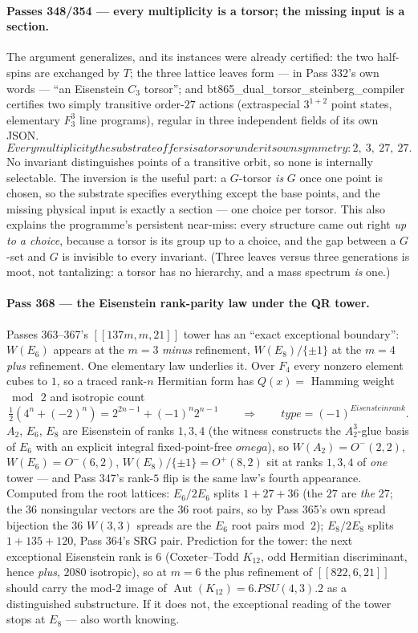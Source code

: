 \documentclass[12pt,a4paper]{article}
\def\mathbb#1{#1}%
\def\mathrm#1{#1}%
\def\textbf#1{#1}%
\def\texttt#1{#1}%
\def\text#1{#1}%
\def\omega{omega}%
\theoremstyle{definition}
\newcommand{\FF}{\mathbb{F}}
\begin{document}
\paragraph{Passes 348/354 --- every multiplicity is a torsor; the missing input
is a section.}
The argument generalizes, and its instances were already certified: the two
half-spins are exchanged by $T$; the three lattice leaves form --- in Pass 332's
own words --- ``an Eisenstein $C_3$ torsor''; and
\texttt{bt865\_dual\_torsor\_steinberg\_compiler} certifies two simply
transitive order-$27$ actions (extraspecial $3^{1+2}$ point states, elementary
$\FF_3^3$ line programs), regular in three independent fields of its own JSON.
\[
\textbf{Every multiplicity the substrate offers is a torsor under its own
symmetry: } 2,\ 3,\ 27,\ 27.
\]
No invariant distinguishes points of a transitive orbit, so none is internally
selectable.  The inversion is the useful part: a $G$-torsor \emph{is} $G$ once
one point is chosen, so \textbf{the substrate specifies everything except the
base points, and the missing physical input is exactly a section} --- one
choice per torsor.  This also explains the programme's persistent near-miss:
every structure came out right \emph{up to a choice}, because a torsor is its
group up to a choice, and the gap between a $G$-set and $G$ is invisible to
every invariant.  (Three leaves versus three generations is moot, not
tantalizing: a torsor has no hierarchy, and a mass spectrum \emph{is} one.)

\paragraph{Pass 368 --- the Eisenstein rank-parity law under the QR tower.}
Passes 363--367's $[[137m,m,21]]$ tower has an ``exact exceptional boundary'':
$W(E_6)$ appears at the $m{=}3$ \emph{minus} refinement, $W(E_8)/\{\pm1\}$ at
the $m{=}4$ \emph{plus} refinement.  One elementary law underlies it.  Over
$\FF_4$ every nonzero element cubes to $1$, so a traced rank-$n$ Hermitian form
has $Q(x)=$ Hamming weight $\bmod\,2$ and isotropic count
\[
\tfrac12\!\left(4^n+(-2)^n\right)=2^{2n-1}+(-1)^n2^{n-1}
\qquad\Longrightarrow\qquad
\textbf{type}=(-1)^{\text{Eisenstein rank}}.
\]
$A_2$, $E_6$, $E_8$ are Eisenstein of ranks $1,3,4$ (the witness constructs the
$A_2^3$-glue basis of $E_6$ with an explicit integral fixed-point-free
$\omega$), so $W(A_2)=O^-(2,2)$, $W(E_6)=O^-(6,2)$, $W(E_8)/\{\pm1\}=O^+(8,2)$
sit at ranks $1,3,4$ of \emph{one} tower --- and Pass 347's rank-$5$ flip is
the same law's fourth appearance.  Computed from the root lattices:
$E_6/2E_6$ splits $1+27+36$ (the $27$ are \emph{the} $27$; the $36$
nonsingular vectors are the $36$ root pairs, so by Pass 365's own spread
bijection \textbf{the $36$ $W(3,3)$ spreads are the $E_6$ root pairs mod~$2$});
$E_8/2E_8$ splits $1+135+120$, Pass 364's SRG pair.  Prediction for the tower:
the next exceptional Eisenstein rank is $6$ (Coxeter--Todd $K_{12}$, odd
Hermitian discriminant, hence \emph{plus}, $2080$ isotropic), so at $m=6$ the
plus refinement of $[[822,6,21]]$ should carry the mod-$2$ image of
$\operatorname{Aut}(K_{12})=6.\mathrm{PSU}(4,3).2$ as a distinguished
substructure.  If it does not, the exceptional reading of the tower stops at
$E_8$ --- also worth knowing.
\end{document}
